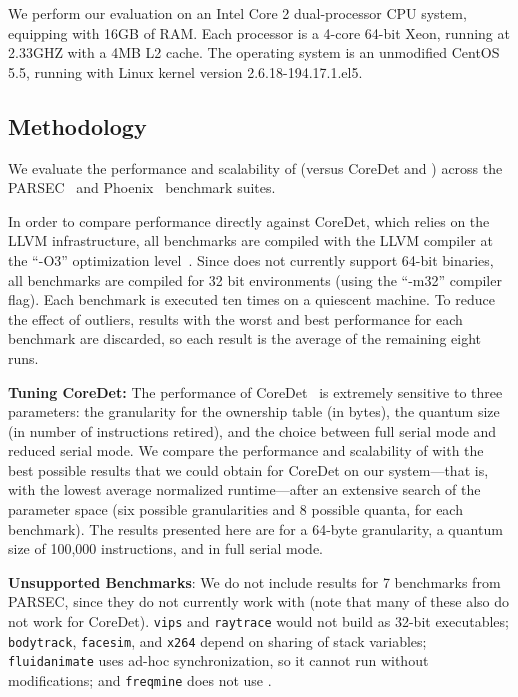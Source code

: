 \label{sec:dthreadsevaluation}

We perform our evaluation on an Intel Core 2 dual-processor CPU system, equipping with 16GB of RAM. Each processor is a 4-core 64-bit Xeon, running at 2.33GHZ with a 4MB L2 cache. The operating system is an unmodified CentOS 5.5, running with Linux kernel version 2.6.18-194.17.1.el5.

\subsection{Methodology}

We evaluate the performance and scalability of \dthreads{} (versus CoreDet and \pthreads{}) across the PARSEC~\cite{parsec} and Phoenix~\cite{phoenix-hpca} benchmark suites.  

In order to compare performance directly against CoreDet, which relies on the LLVM infrastructure, all benchmarks are compiled with the LLVM compiler at the ``-O3'' optimization level~\cite{LLVM:CGO04}. Since \dthreads{} does not currently support 64-bit binaries, all benchmarks are compiled for 32 bit environments (using the ``-m32'' compiler flag). Each benchmark is executed ten times on a quiescent machine. To reduce the effect of outliers, results with the worst and best performance for each benchmark are discarded,
so each result is the average of the remaining eight runs.

\textbf{Tuning CoreDet:} 
The performance of CoreDet~\cite{Bergan:2010:CCR:1736020.1736029} is extremely sensitive to three parameters: the granularity for the ownership table (in bytes), the quantum size (in number of instructions retired), and the choice between full serial mode and reduced serial mode. We compare the performance and scalability of \dthreads{} with the best possible results that we could obtain for CoreDet on our system---that is, with the lowest average normalized
runtime---after an extensive search of the parameter space (six possible granularities and 8 possible quanta, for each benchmark). The results presented here are for a 64-byte granularity, a quantum size of 100,000 instructions, and in full serial mode.

\textbf{Unsupported Benchmarks}: We do not include results for 7 benchmarks from PARSEC, since they do not currently work with \dthreads{} (note that many of these also do not work for CoreDet). \texttt{vips} and \texttt{raytrace} would not build as 32-bit executables; \texttt{bodytrack}, \texttt{facesim}, and \texttt{x264} depend on sharing of stack variables;
\texttt{fluidanimate} uses ad-hoc synchronization, so it cannot run without modifications; and \texttt{freqmine} does not use \pthreads{}.

